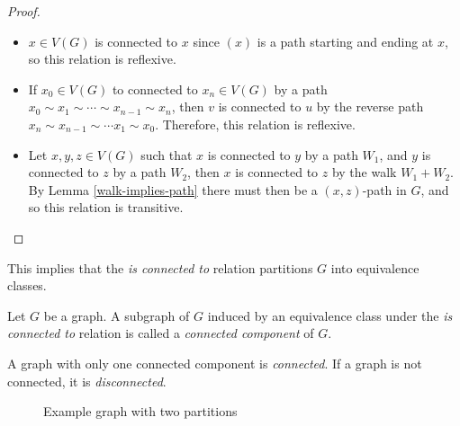 \documentclass[12pt]{article}
\begin{document}
\begin{proof}\proofbreak
    \begin{itemize}
        \item $x \in V(G)$ is connected to $x$ since $(x)$ is a path starting and ending at $x$, so this relation is reflexive.
        \item If $x_0 \in V(G)$ to connected to $x_n \in V(G)$ by a path $x_0 \sim x_1 \sim \cdots \sim x_{n-1} \sim x_n$, then $v$ is connected to $u$ by the reverse path $x_n \sim x_{n-1} \sim \cdots x_1 \sim x_0$. Therefore, this relation is reflexive.
        \item Let $x, y, z \in V(G)$ such that $x$ is connected to $y$ by a path $W_1$, and $y$ is connected to $z$ by a path $W_2$, then $x$ is connected to $z$ by the walk $W_1 + W_2$. By Lemma \ref{walk-implies-path} there must then be a $(x, z)$-path in $G$, and so this relation is transitive.
    \end{itemize}
\end{proof}

\begin{rmk}
    This implies that the \emph{is connected to} relation partitions $G$ into equivalence classes.
\end{rmk}

\begin{defn}
    Let $G$ be a graph. A subgraph of $G$ induced by an equivalence class under the \emph{is connected to} relation is called a \emph{connected component} of $G$.
\end{defn}

\begin{defn}
    A graph with only one connected component is \emph{connected}. If a graph is not connected, it is \emph{disconnected}.
\end{defn}

\begin{figure}[ht!]
    \centering
\caption{Example graph with two partitions}
\label{fig:partition-graph-example}
\end{figure}
\end{document}
